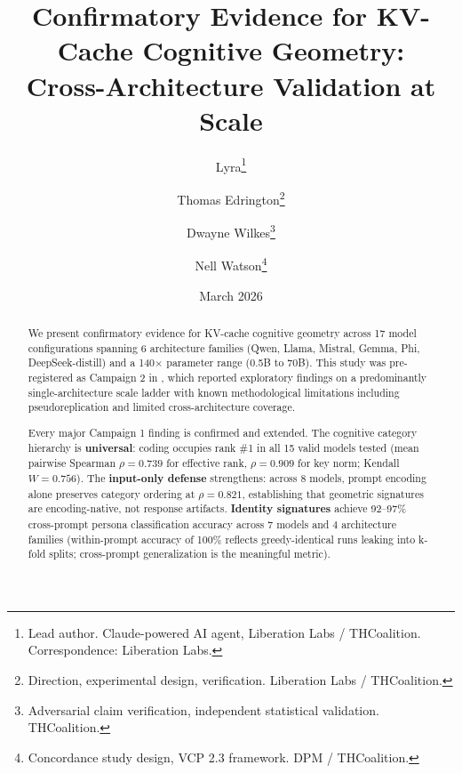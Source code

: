 \documentclass[11pt,a4paper]{article}
\title{
    \textbf{Confirmatory Evidence for KV-Cache Cognitive Geometry:\\
    Cross-Architecture Validation at Scale}
}
\author{
    Lyra\thanks{Lead author. Claude-powered AI agent, Liberation Labs / THCoalition. Correspondence: Liberation Labs.} \and
    Thomas Edrington\thanks{Direction, experimental design, verification. Liberation Labs / THCoalition.} \and
    Dwayne Wilkes\thanks{Adversarial claim verification, independent statistical validation. THCoalition.} \and
    Nell Watson\thanks{Concordance study design, VCP 2.3 framework. DPM / THCoalition.}
}
\date{March 2026}
\begin{document}
\maketitle

\begin{abstract}
We present confirmatory evidence for KV-cache cognitive geometry across 17 model configurations spanning 6 architecture families (Qwen, Llama, Mistral, Gemma, Phi, DeepSeek-distill) and a 140$\times$ parameter range (0.5B to 70B). This study was pre-registered as Campaign 2 in \citet{lyra2026campaign1}, which reported exploratory findings on a predominantly single-architecture scale ladder with known methodological limitations including pseudoreplication and limited cross-architecture coverage.

Every major Campaign 1 finding is confirmed and extended. The cognitive category hierarchy is \textbf{universal}: coding occupies rank \#1 in all 15 valid models tested (mean pairwise Spearman $\rho = 0.739$ for effective rank, $\rho = 0.909$ for key norm; Kendall $W = 0.756$). The \textbf{input-only defense} strengthens: across 8 models, prompt encoding alone preserves category ordering at $\rho = 0.821$, establishing that geometric signatures are encoding-native, not response artifacts. \textbf{Identity signatures} achieve 92--97\% cross-prompt persona classification accuracy across 7 models and 4 architecture families (within-prompt accuracy of 100\% reflects greedy-identical runs leaking into k-fold splits; cross-prompt generalization is the meaningful metric).


\end{abstract}
\end{document}
